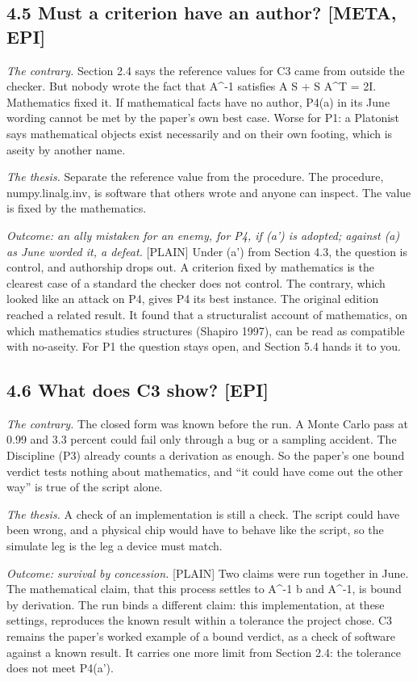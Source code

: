 \documentclass[11pt]{article}
\newcommand{\register}[1]{{\ttfamily\small #1}}
\begin{document}
\subsection*{4.5 Must a criterion have an author? [META, EPI]}

\emph{The contrary.} Section 2.4 says the reference values for C3 came from outside the checker. But nobody wrote the fact that A\textasciicircum{}-1 satisfies A S + S A\textasciicircum{}T = 2I. Mathematics fixed it. If mathematical facts have no author, P4(a) in its June wording cannot be met by the paper's own best case. Worse for P1: a Platonist says mathematical objects exist necessarily and on their own footing, which is aseity by another name.

\emph{The thesis.} Separate the reference value from the procedure. The procedure, numpy.linalg.inv, is software that others wrote and anyone can inspect. The value is fixed by the mathematics.

\emph{Outcome: an ally mistaken for an enemy, for P4, if (a') is adopted; against (a) as June worded it, a defeat.} \register{[PLAIN]} Under (a') from Section 4.3, the question is control, and authorship drops out. A criterion fixed by mathematics is the clearest case of a standard the checker does not control. The contrary, which looked like an attack on P4, gives P4 its best instance. The original edition reached a related result. It found that a structuralist account of mathematics, on which mathematics studies structures (Shapiro 1997), can be read as compatible with no-aseity. For P1 the question stays open, and Section 5.4 hands it to you.

\subsection*{4.6 What does C3 show? [EPI]}

\emph{The contrary.} The closed form was known before the run. A Monte Carlo pass at 0.99 and 3.3 percent could fail only through a bug or a sampling accident. The Discipline (P3) already counts a derivation as enough. So the paper's one bound verdict tests nothing about mathematics, and ``it could have come out the other way'' is true of the script alone.

\emph{The thesis.} A check of an implementation is still a check. The script could have been wrong, and a physical chip would have to behave like the script, so the simulate leg is the leg a device must match.

\emph{Outcome: survival by concession.} \register{[PLAIN]} Two claims were run together in June. The mathematical claim, that this process settles to A\textasciicircum{}-1 b and A\textasciicircum{}-1, is bound by derivation. The run binds a different claim: this implementation, at these settings, reproduces the known result within a tolerance the project chose. C3 remains the paper's worked example of a bound verdict, as a check of software against a known result. It carries one more limit from Section 2.4: the tolerance does not meet P4(a').
\end{document}
